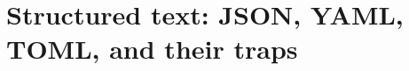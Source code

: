 \chapter{Structured text: JSON, YAML, TOML, and their traps}
\label{ch:structured-text-json-yaml-toml-and}

